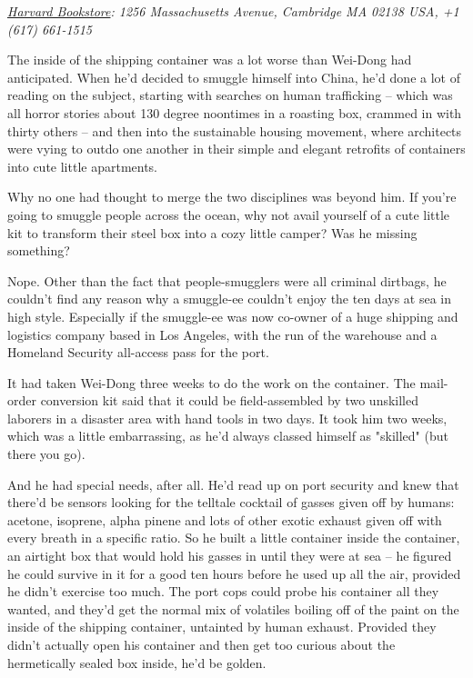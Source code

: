 \emph{\href{http://www.harvard.com/}{Harvard Bookstore}: 1256 Massachusetts Avenue, Cambridge MA 02138 USA, +1 (617) 661-1515}

The inside of the shipping container was a lot worse than Wei-Dong
had anticipated. When he'd decided to smuggle himself into China,
he'd done a lot of reading on the subject, starting with searches
on human trafficking -- which was all horror stories about 130
degree noontimes in a roasting box, crammed in with thirty others
-- and then into the sustainable housing movement, where architects
were vying to outdo one another in their simple and elegant
retrofits of containers into cute little apartments.

Why no one had thought to merge the two disciplines was beyond him.
If you're going to smuggle people across the ocean, why not avail
yourself of a cute little kit to transform their steel box into a
cozy little camper? Was he missing something?

Nope. Other than the fact that people-smugglers were all criminal
dirtbags, he couldn't find any reason why a smuggle-ee couldn't
enjoy the ten days at sea in high style. Especially if the
smuggle-ee was now co-owner of a huge shipping and logistics
company based in Los Angeles, with the run of the warehouse and a
Homeland Security all-access pass for the port.

It had taken Wei-Dong three weeks to do the work on the container.
The mail-order conversion kit said that it could be field-assembled
by two unskilled laborers in a disaster area with hand tools in two
days. It took him two weeks, which was a little embarrassing, as
he'd always classed himself as "skilled" (but there you go).

And he had special needs, after all. He'd read up on port security
and knew that there'd be sensors looking for the telltale cocktail
of gasses given off by humans: acetone, isoprene, alpha pinene and
lots of other exotic exhaust given off with every breath in a
specific ratio. So he built a little container inside the
container, an airtight box that would hold his gasses in until they
were at sea -- he figured he could survive in it for a good ten
hours before he used up all the air, provided he didn't exercise
too much. The port cops could probe his container all they wanted,
and they'd get the normal mix of volatiles boiling off of the paint
on the inside of the shipping container, untainted by human
exhaust. Provided they didn't actually open his container and then
get too curious about the hermetically sealed box inside, he'd be
golden.

